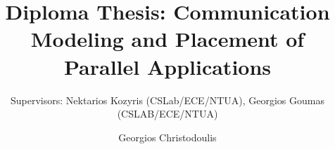 \documentclass{beamer}
\title[George Christodoulis]{Diploma Thesis: Communication Modeling and Placement of Parallel Applications} %
\subtitle{{\fontsize{8}{6}\selectfont Supervisors: Nektarios Kozyris (CSLab/ECE/NTUA), Georgios Goumas (CSLAB/ECE/NTUA)}}
\author{Georgios Christodoulis} %
\institute[NTUA] %
{
ECE$-$NTUA \\ %
\medskip
\textit{gchristodoulis@gmail.com} %
}
\date{}
\begin{document}
\begin{frame}
\titlepage %
\end{frame}


\iffalse
\end{document}
